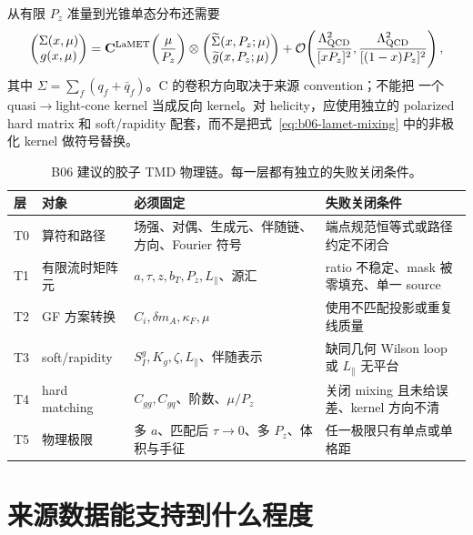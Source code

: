 从有限 \(P_z\) 准量到光锥单态分布还需要
\begin{equation}
  \begin{pmatrix}\Sigma(x,\mu)\\ g(x,\mu)\end{pmatrix}
  =\mathbf C^{\rm LaMET}\!\left(\frac{\mu}{P_z}\right)\otimes
  \begin{pmatrix}\widetilde\Sigma(x,P_z;\mu)\\ \widetilde g(x,P_z;\mu)\end{pmatrix}
  +\mathcal O\!\left(\frac{\Lambda_{\rm QCD}^2}{[xP_z]^2},
  \frac{\Lambda_{\rm QCD}^2}{[(1-x)P_z]^2}\right),
  \label{eq:b06-lamet-mixing}
\end{equation}
其中 \(\Sigma=\sum_f(q_f+\bar q_f)\)。C 的卷积方向取决于来源 convention；不能把
一个 quasi\(\to\)light-cone kernel 当成反向 kernel。对 helicity，应使用独立的
polarized hard matrix 和 soft/rapidity 配套，而不是把式~\eqref{eq:b06-lamet-mixing}
中的非极化 kernel 做符号替换。

\begin{table}[htbp]
\centering
\caption{B06 建议的胶子 TMD 物理链。每一层都有独立的失败关闭条件。}
\label{tab:b06-tmd-chain}
\small
\begin{tabularx}{\textwidth}{@{}p{}p{}p{}X@{}}
\toprule
层 & 对象 & 必须固定 & 失败关闭条件 \\
\midrule
T0 & 算符和路径 & 场强、对偶、生成元、伴随链、方向、Fourier 符号 & 端点规范恒等式或路径约定不闭合 \\
T1 & 有限流时矩阵元 & \(a,\tau,z,b_T,P_z,L_\parallel\)、源汇 & ratio 不稳定、mask 被零填充、单一 source \\
T2 & GF 方案转换 & \(C_i,\delta m_A,\kappa_F,\mu\) & 使用不匹配投影或重复线质量 \\
T3 & soft/rapidity & \(S_I^g,K_g,\zeta,L_\parallel\)、伴随表示 & 缺同几何 Wilson loop 或 \(L_\parallel\) 无平台 \\
T4 & hard matching & \(C_{gg},C_{gq}\)、阶数、\(\mu/P_z\) & 关闭 mixing 且未给误差、kernel 方向不清 \\
T5 & 物理极限 & 多 \(a\)、匹配后 \(\tau\to0\)、多 \(P_z\)、体积与手征 & 任一极限只有单点或单格距 \\
\bottomrule
\end{tabularx}
\end{table}

\section{来源数据能支持到什么程度}


